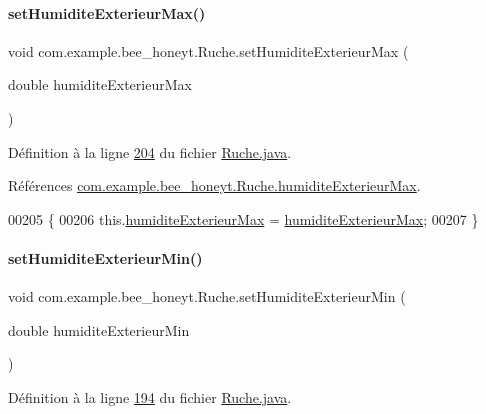 \paragraph{\texorpdfstring{set\+Humidite\+Exterieur\+Max()}{setHumiditeExterieurMax()}}
{\footnotesize\ttfamily void com.\+example.\+bee\+\_\+honeyt.\+Ruche.\+set\+Humidite\+Exterieur\+Max (\begin{DoxyParamCaption}\item[{double}]{humidite\+Exterieur\+Max }\end{DoxyParamCaption})}



Définition à la ligne \hyperlink{_ruche_8java_source_l00204}{204} du fichier \hyperlink{_ruche_8java_source}{Ruche.\+java}.



Références \hyperlink{_ruche_8java_source_l00032}{com.\+example.\+bee\+\_\+honeyt.\+Ruche.\+humidite\+Exterieur\+Max}.


\begin{DoxyCode}
00205     \{
00206         this.\hyperlink{classcom_1_1example_1_1bee__honeyt_1_1_ruche_a76e636b4d5e0a18b187905e0d6d73a71}{humiditeExterieurMax} = \hyperlink{classcom_1_1example_1_1bee__honeyt_1_1_ruche_a76e636b4d5e0a18b187905e0d6d73a71}{humiditeExterieurMax};
00207     \}
\end{DoxyCode}
\mbox{\label{classcom_1_1example_1_1bee__honeyt_1_1_ruche_ab4e0d29d75a71336a51dad3d4f17b758}} 
\paragraph{\texorpdfstring{set\+Humidite\+Exterieur\+Min()}{setHumiditeExterieurMin()}}
{\footnotesize\ttfamily void com.\+example.\+bee\+\_\+honeyt.\+Ruche.\+set\+Humidite\+Exterieur\+Min (\begin{DoxyParamCaption}\item[{double}]{humidite\+Exterieur\+Min }\end{DoxyParamCaption})}



Définition à la ligne \hyperlink{_ruche_8java_source_l00194}{194} du fichier \hyperlink{_ruche_8java_source}{Ruche.\+java}.



